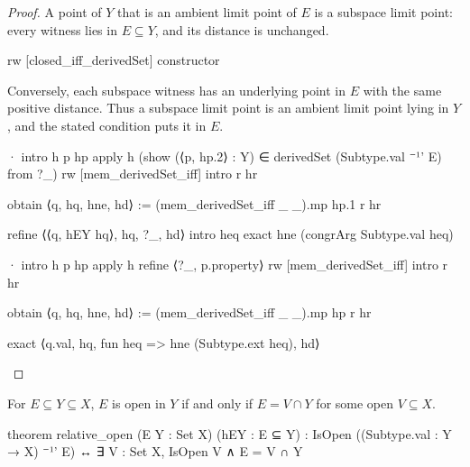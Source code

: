 \begin{proof}
  A point of $Y$ that is an ambient limit point of $E$ is a subspace limit point: every witness
  lies in $E\subseteq Y$, and its distance is unchanged.

  \begin{lean}
    rw [closed_iff_derivedSet]
    constructor
  \end{lean}

  Conversely, each subspace witness has an underlying point in $E$ with the same positive
  distance.
  Thus a subspace limit point is an ambient limit point lying in $Y$, and the stated condition puts
  it in $E$.

  \begin{lean}
    · intro h p hp
      apply h (show (⟨p, hp.2⟩ : Y) ∈ derivedSet (Subtype.val ⁻¹' E) from ?_)
      rw [mem_derivedSet_iff]
      intro r hr

      obtain ⟨q, hq, hne, hd⟩ := (mem_derivedSet_iff _ _).mp hp.1 r hr

      refine ⟨⟨q, hEY hq⟩, hq, ?_, hd⟩
      intro heq
      exact hne (congrArg Subtype.val heq)

    · intro h p hp
      apply h
      refine ⟨?_, p.property⟩
      rw [mem_derivedSet_iff]
      intro r hr

      obtain ⟨q, hq, hne, hd⟩ := (mem_derivedSet_iff _ _).mp hp r hr

      exact ⟨q.val, hq, fun heq => hne (Subtype.ext heq), hd⟩
  \end{lean}

\end{proof}

\begin{proposition}
  \label{ma:thm:open-set-relative-to-subspace}
  For $E\subseteq Y\subseteq X$, $E$ is open in $Y$ if and only if $E=V\cap Y$ for some open
  $V\subseteq X$.

  \begin{lean}
    theorem relative_open (E Y : Set X) (hEY : E ⊆ Y) :
        IsOpen ((Subtype.val : Y → X) ⁻¹' E) ↔
          ∃ V : Set X, IsOpen V ∧ E = V ∩ Y
  \end{lean}
\end{proposition}

